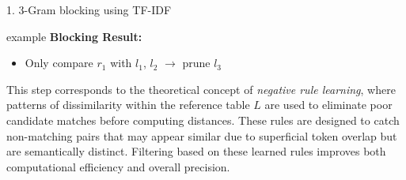 \documentclass[8pt]{beamer} %
\begin{document}
\begin{frame}{1. 3-Gram blocking using TF-IDF}
\begin{beamercolorbox}[rounded=true, shadow=true, leftskip=1em, rightskip=1em]{example}
		\textbf{Blocking Result:}
		\begin{itemize}
			\item Only compare $r_1$ with $l_1$, $l_2$ $\rightarrow$ prune $l_3$
		\end{itemize}
	\end{beamercolorbox}
	
	
\end{frame}

\begin{frame}
This step corresponds to the theoretical concept of \textit{negative rule learning}, where patterns of dissimilarity within the reference table $L$ are used to eliminate poor candidate matches before computing distances. These rules are designed to catch non-matching pairs that may appear similar due to superficial token overlap but are semantically distinct. Filtering based on these learned rules improves both computational efficiency and overall precision.

\end{frame}
\end{document}
